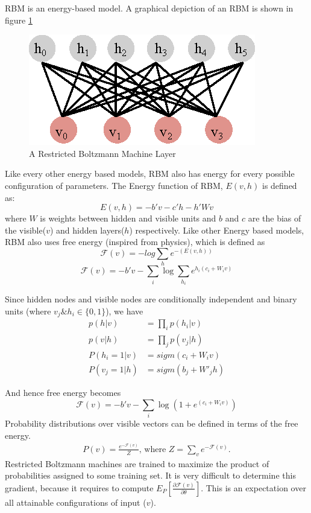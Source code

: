 RBM is an energy-based model. A graphical depiction of an RBM is shown in figure \ref{fig:rbm_layer}
\begin{figure}[!ht]
    \centering
    \includegraphics[scale=0.9]{./imgs/rbm.eps}
    \caption{A Restricted Boltzmann Machine Layer}
    \label{fig:rbm_layer}
\end{figure}%

Like every other energy based models, RBM also has energy for every possible configuration of parameters. The Energy function of RBM, $E(v,h)$ is defined as: 
$$E(v,h) = - b'v - c'h - h'Wv$$
where $W$ is weights between hidden and visible units and $b$ and $c$  are the bias of the visible($v$) and hidden layers($h$) respectively. Like other Energy based models, RBM also uses free energy (inspired from physics), which is defined as
$$\mathcal{F}(v) = -log \sum_{h}{e^{-(E(v,h))}}  $$
$$\mathcal{F}(v) = - b'v - \sum_i \log \sum_{h_i} e^{h_i (c_i + W_i v)}$$

Since hidden nodes and visible nodes are conditionally independent and binary units (where $v_j \& h_i \in \{0,1\}$), we have 
\begin{align}
p(h|v) &= \prod_i p(h_i|v) \\
p(v|h) &= \prod_j p(v_j|h) \\
P(h_i=1|v) &= sigm(c_i + W_i v) \label{eq:rbm_layers_prob1} \\
P(v_j=1|h) &= sigm(b_j + W'_j h) \label{eq:rbm_layers_prob2}  
\end{align}

And hence free energy becomes 
$$\mathcal{F}(v)= - b'v - \sum_i \log(1 + e^{(c_i + W_i v)})$$ %
Probability distributions over visible vectors can be defined in terms of the free energy.
\begin{align*}
P(v) = \frac{e^{-\mathcal{F}(v)}}{Z} \text{, where } Z=\sum_v e^{-\mathcal{F}(v)}.
\end{align*}
Restricted Boltzmann machines are trained to maximize the product of probabilities assigned to some training set. It is very difficult to determine this gradient, because it requires to compute $E_P[\frac{\partial \mathcal{F}(v)} {\partial \theta} ]$. This is an expectation over all attainable configurations of input ($v$). \cite{hinton2010practical}

